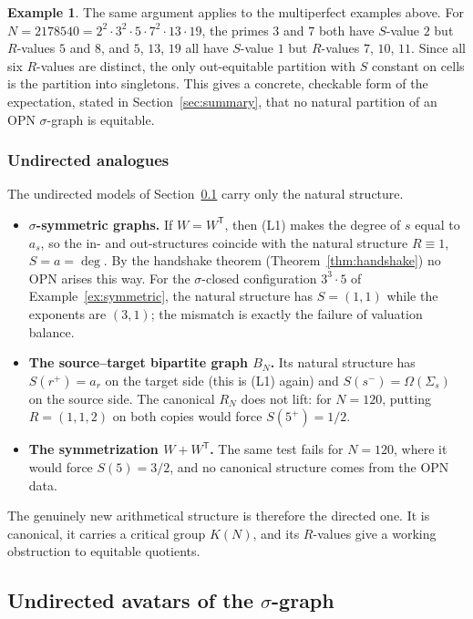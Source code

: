\documentclass[11pt]{article}
\theoremstyle{definition}
\newtheorem{example}[theorem]{Example}
\theoremstyle{remark}
\begin{document}
\begin{example}
The same argument applies to the multiperfect examples above.  For
$N=2178540=2^2\cdot3^2\cdot5\cdot7^2\cdot13\cdot19$, the primes $3$ and
$7$ both have $S$-value $2$ but $R$-values $5$ and $8$, and $5$, $13$, $19$
all have $S$-value $1$ but $R$-values $7$, $10$, $11$.  Since all six
$R$-values are distinct, the only out-equitable partition with $S$ constant
on cells is the partition into singletons.  This gives a concrete, checkable
form of the expectation, stated in Section~\ref{sec:summary}, that no natural
partition of an OPN $\sigma$-graph is equitable.
\end{example}

\subsubsection{Undirected analogues}

The undirected models of Section~\ref{sec:undirected} carry only the
natural structure.
\begin{itemize}[leftmargin=1.5em]
\item \textbf{$\sigma$-symmetric graphs.}  If $W=W^{\mathsf T}$, then (L1)
  makes the degree of $s$ equal to $a_s$, so the in- and out-structures
  coincide with the natural structure $R\equiv1$, $S=a=\deg$.  By the
  handshake theorem (Theorem~\ref{thm:handshake}) no OPN arises this way.
  For the $\sigma$-closed configuration $3^3\cdot5$ of
  Example~\ref{ex:symmetric}, the natural structure has $S=(1,1)$ while the
  exponents are $(3,1)$; the mismatch is exactly the failure of valuation
  balance.
\item \textbf{The source--target bipartite graph $B_N$.}  Its natural
  structure has $S(r^+)=a_r$ on the target side (this is (L1) again) and
  $S(s^-)=\Omega(\Sigma_s)$ on the source side.  The canonical $R_N$ does
  not lift: for $N=120$, putting $R=(1,1,2)$ on both copies would force
  $S(5^+)=1/2$.
\item \textbf{The symmetrization $W+W^{\mathsf T}$.}  The same test fails
  for $N=120$, where it would force $S(5)=3/2$, and no canonical structure
  comes from the OPN data.
\end{itemize}
The genuinely new arithmetical structure is therefore the directed one.  It
is canonical, it carries a critical group $K(N)$, and its $R$-values give a
working obstruction to equitable quotients.

\subsection{Undirected avatars of the $\sigma$-graph}\label{sec:undirected}
\end{document}
